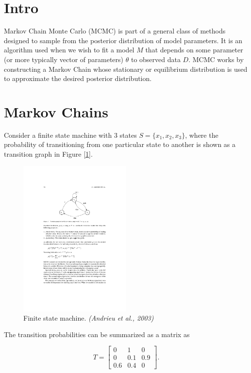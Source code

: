 
\section{Intro}

    Markov Chain Monte Carlo (MCMC) is part of a general class of methods designed to sample from the posterior distribution of model parameters. It is an algorithm used when we wish to fit a model $M$ that depends on some parameter (or more typically vector of parameters) $\theta$ to observed data $D$. MCMC works by constructing a Markov Chain whose stationary or equilibrium distribution is used to approximate the desired posterior distribution.


\section{Markov Chains}

    Consider a finite state machine with 3 states $S = \{x_1, x_2, x_3\}$, where the probability of transitioning from one particular state to another is shown as a transition graph in Figure [\ref{fsm}]. 

    \begin{figure}
        \centering
        \includegraphics[width=0.5\textwidth]{./images/finitemachine.pdf}
        \caption{Finite state machine. \textit{(Andrieu et al., 2003)} \label{fsm}}
    \end{figure}

    The transition probabilities can be summarized as a matrix as

    $$
    T = 
    \begin{bmatrix}
        0 & 1 & 0 \\
        0 & 0.1 & 0.9 \\
        0.6 & 0.4 & 0
    \end{bmatrix}.
    $$

